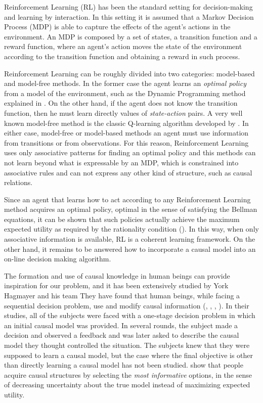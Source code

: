 \documentclass[english,letterpaper,12pt,final]{article}
\theoremstyle{definition}
\begin{document}
Reinforcement Learning (RL) has been the standard setting for decision-making and learning by interaction. In this setting it is assumed that a Markov Decision Process (MDP) is able to capture the effects of the agent's actions in the environment. An MDP is composed by a set of states, a transition function and a reward function, where an agent's action moves the state of the environment according to the transition function and obtaining a reward in such process.

Reinforcement Learning can be roughly divided into two categories: model-based and model-free methods. In the former case the agent learns an \textit{optimal policy} from a model of the environment, such as the Dynamic Programming method explained in \cite{sutton1998reinforcement}. On the other hand, if the agent does not know the transition function, then he must learn directly values of \textit{state-action} pairs. A very well known model-free method is the classic Q-learning algorithm developed by \cite{watkins1992q}. In either case, model-free or model-based methods an agent must use information from transitions or from observations. For this reason, Reinforcement Learning uses only associative patterns for finding an optimal policy and this methods can not learn beyond what is expressable by an MDP, which is constrained into associative rules and can not express any other kind of structure, such as causal relations. 

Since an agent that learns how to act according to any Reinforcement Learning method acquires an optimal policy, optimal in the sense of satisfying the Bellman equations, it can be shown that such policies actually achieve the maximum expected utility as required by the rationality condition (\cite{webb2007game}). In this way, when only associative information is available, RL is a coherent learning framework. On the other hand, it remains to be answered how to incorporate a causal model into an on-line decision making algorithm.

The formation and use of causal knowledge in human beings can provide inspiration for our problem, and it has been extensively studied by York Hagmayer and his team They have found that human beings, while facing a sequential decision problem, use and modify causal information (\cite{hagmayer2008causal}, \cite{hagmayer2009decision}, \cite{hagmayer2010spontaneous}, \cite{hagmayer2013repeated}). In their studies, all of the subjects were faced with a one-stage decision problem in which an initial causal model was provided. In several rounds, the subject made a decision and observed a feedback and was later asked to describe the causal model they thought controlled the situation. The subjects knew that they were supposed to learn a causal model, but the case where the final objective is other than directly learning a causal model has not been studied. \cite{bramley2015conservative} show that people acquire causal structures by selecting the \textit{most informative} options, in the sense of decreasing uncertainty about the true model instead of maximizing expected utility.
\end{document}
